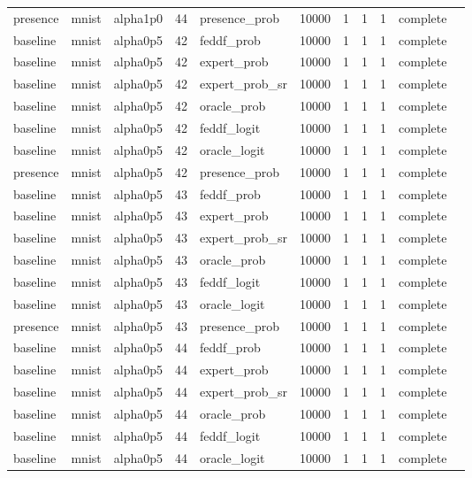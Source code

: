 \begin{tabular}{lllrlrrrrll}
presence & mnist & alpha1p0 & 44 & presence\_prob & 10000 & 1 & 1 & 1 & complete &  \\
baseline & mnist & alpha0p5 & 42 & feddf\_prob & 10000 & 1 & 1 & 1 & complete &  \\
baseline & mnist & alpha0p5 & 42 & expert\_prob & 10000 & 1 & 1 & 1 & complete &  \\
baseline & mnist & alpha0p5 & 42 & expert\_prob\_sr & 10000 & 1 & 1 & 1 & complete &  \\
baseline & mnist & alpha0p5 & 42 & oracle\_prob & 10000 & 1 & 1 & 1 & complete &  \\
baseline & mnist & alpha0p5 & 42 & feddf\_logit & 10000 & 1 & 1 & 1 & complete &  \\
baseline & mnist & alpha0p5 & 42 & oracle\_logit & 10000 & 1 & 1 & 1 & complete &  \\
presence & mnist & alpha0p5 & 42 & presence\_prob & 10000 & 1 & 1 & 1 & complete &  \\
baseline & mnist & alpha0p5 & 43 & feddf\_prob & 10000 & 1 & 1 & 1 & complete &  \\
baseline & mnist & alpha0p5 & 43 & expert\_prob & 10000 & 1 & 1 & 1 & complete &  \\
baseline & mnist & alpha0p5 & 43 & expert\_prob\_sr & 10000 & 1 & 1 & 1 & complete &  \\
baseline & mnist & alpha0p5 & 43 & oracle\_prob & 10000 & 1 & 1 & 1 & complete &  \\
baseline & mnist & alpha0p5 & 43 & feddf\_logit & 10000 & 1 & 1 & 1 & complete &  \\
baseline & mnist & alpha0p5 & 43 & oracle\_logit & 10000 & 1 & 1 & 1 & complete &  \\
presence & mnist & alpha0p5 & 43 & presence\_prob & 10000 & 1 & 1 & 1 & complete &  \\
baseline & mnist & alpha0p5 & 44 & feddf\_prob & 10000 & 1 & 1 & 1 & complete &  \\
baseline & mnist & alpha0p5 & 44 & expert\_prob & 10000 & 1 & 1 & 1 & complete &  \\
baseline & mnist & alpha0p5 & 44 & expert\_prob\_sr & 10000 & 1 & 1 & 1 & complete &  \\
baseline & mnist & alpha0p5 & 44 & oracle\_prob & 10000 & 1 & 1 & 1 & complete &  \\
baseline & mnist & alpha0p5 & 44 & feddf\_logit & 10000 & 1 & 1 & 1 & complete &  \\
baseline & mnist & alpha0p5 & 44 & oracle\_logit & 10000 & 1 & 1 & 1 & complete &  \\

\end{tabular}
